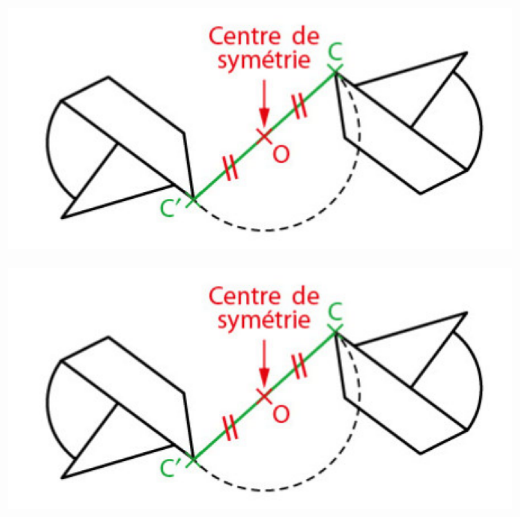\documentclass[12pt,a4paper]{article}
\date{}
\title{}
\begin{document}





%	
%	
%
%

%
%
%
%


\begin{center}
	\includegraphics[scale=.75]{fig2}
\end{center}

\begin{center}
	\includegraphics[scale=.75]{fig2}
\end{center}
\end{document}
